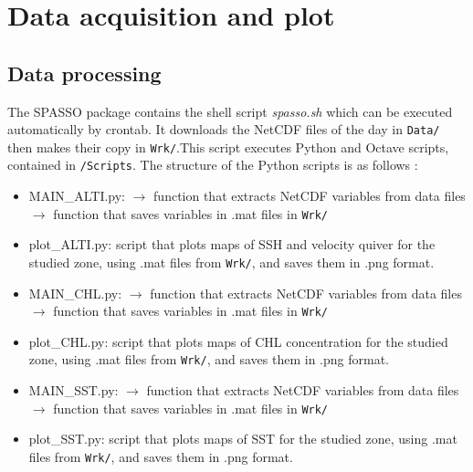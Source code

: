 \documentclass[12pt,a4paper]{article}
\begin{document}
\newpage

\section{Data acquisition and plot}
\subsection{Data processing}
The SPASSO package contains the shell script \textit{spasso.sh} which can be executed automatically by crontab. It downloads the NetCDF files of the day in \texttt{Data/} then makes their copy in \texttt{Wrk/}.This script executes Python and Octave scripts, contained in \texttt{/Scripts}. The structure of the Python scripts is as follows :\newline
\begin{itemize}
\item MAIN\_ALTI.py: \newline
\indent $\rightarrow$ function that extracts NetCDF variables from data files \newline
\indent $\rightarrow$ function that saves variables in .mat files in \texttt{Wrk/} \newline
\newline
\item plot\_ALTI.py: script that plots maps of SSH and velocity quiver for the studied zone, using .mat files from \texttt{Wrk/}, and saves them in .png format.\newline
\item MAIN\_CHL.py: \newline
\indent $\rightarrow$ function that extracts NetCDF variables from data files \newline
\indent $\rightarrow$ function that saves variables in .mat files in \texttt{Wrk/} \newline
\newline
\item plot\_CHL.py: script that plots maps of CHL concentration for the studied zone, using .mat files from \texttt{Wrk/}, and saves them in .png format.\newline
\newline
\item MAIN\_SST.py: \newline
\indent $\rightarrow$ function that extracts NetCDF variables from data files \newline
\indent $\rightarrow$ function that saves variables in .mat files in \texttt{Wrk/} \newline
\newline
\item plot\_SST.py: script that plots maps of SST for the studied zone, using .mat files from \texttt{Wrk/}, and saves them in .png format.\newline
\end{itemize}
\end{document}
